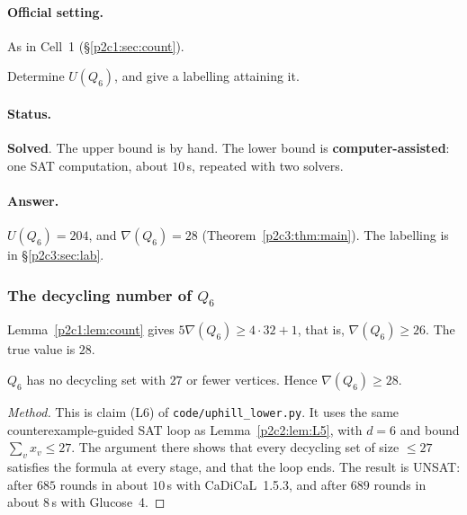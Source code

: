 
\paragraph{Official setting.} As in Cell~1 (\S\ref{p2c1:sec:count}).

\begin{statement}
Determine $U(Q_6)$, and give a labelling attaining it.
\end{statement}

\paragraph{Status.} \textbf{Solved}. The upper bound is by hand. The lower bound is
\textbf{computer-assisted}: one SAT computation, about $10$\,s, repeated with two solvers.

\paragraph{Answer.} $U(Q_6)=204$, and $\nabla(Q_6)=28$ (Theorem~\ref{p2c3:thm:main}).
The labelling is in \S\ref{p2c3:sec:lab}.

\subsubsection{The decycling number of $Q_6$}

Lemma~\ref{p2c1:lem:count} gives $5\nabla(Q_6)\ge4\cdot32+1$, that is, $\nabla(Q_6)\ge26$. The
true value is $28$.

\begin{lemma}\label{p2c3:lem:L6}
$Q_6$ has no decycling set with $27$ or fewer vertices. Hence $\nabla(Q_6)\ge28$.
\end{lemma}

\begin{proof}[Method]
This is claim (L6) of \texttt{code/uphill\_lower.py}. It uses the same counterexample-guided SAT
loop as Lemma~\ref{p2c2:lem:L5}, with $d=6$ and bound $\sum_vx_v\le27$. The argument there shows
that every decycling set of size $\le27$ satisfies the formula at every stage, and that the loop
ends. The result is UNSAT: after $685$ rounds in about $10$\,s with CaDiCaL~1.5.3, and after
$689$ rounds in about $8$\,s with Glucose~4.
\end{proof}

